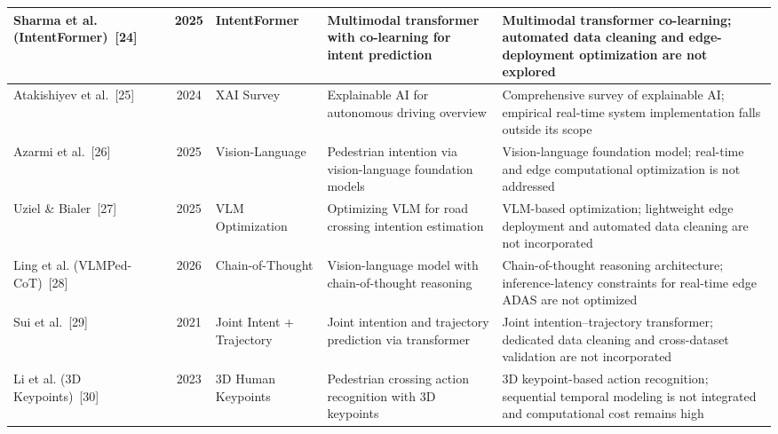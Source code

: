 \documentclass[conference]{IEEEtran}
\begin{document}
\begin{table}[htbp]
\begin{tabular}{|p{2.2cm}|c|p{2.5cm}|p{4.0cm}|p{4.5cm}|}
\hline
Sharma et al. (IntentFormer)~[24] & 2025 & IntentFormer & Multimodal transformer with co-learning for intent prediction & Multimodal transformer co-learning; automated data cleaning and edge-deployment optimization are not explored \\
\hline
Atakishiyev et al.~[25] & 2024 & XAI Survey & Explainable AI for autonomous driving overview & Comprehensive survey of explainable AI; empirical real-time system implementation falls outside its scope \\
\hline
Azarmi et al.~[26] & 2025 & Vision-Language & Pedestrian intention via vision-language foundation models & Vision-language foundation model; real-time and edge computational optimization is not addressed \\
\hline
Uziel \& Bialer~[27] & 2025 & VLM Optimization & Optimizing VLM for road crossing intention estimation & VLM-based optimization; lightweight edge deployment and automated data cleaning are not incorporated \\
\hline
Ling et al. (VLMPed-CoT)~[28] & 2026 & Chain-of-Thought & Vision-language model with chain-of-thought reasoning & Chain-of-thought reasoning architecture; inference-latency constraints for real-time edge ADAS are not optimized \\
\hline
Sui et al.~[29] & 2021 & Joint Intent + Trajectory & Joint intention and trajectory prediction via transformer & Joint intention--trajectory transformer; dedicated data cleaning and cross-dataset validation are not incorporated \\
\hline
Li et al. (3D Keypoints)~[30] & 2023 & 3D Human Keypoints & Pedestrian crossing action recognition with 3D keypoints & 3D keypoint-based action recognition; sequential temporal modeling is not integrated and computational cost remains high \\
\hline
\end{tabular}
\end{table}
\end{document}
